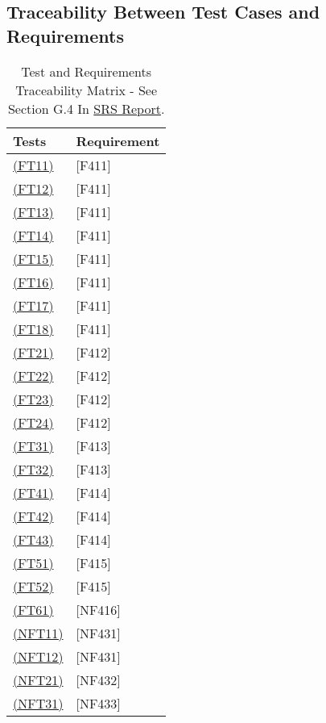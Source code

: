 \documentclass[12pt, titlepage]{article}
\begin{document}
\subsection{Traceability Between Test Cases and Requirements}

\begin{table}[H]
  
  \centering
  \caption{Test and Requirements Traceability Matrix - See Section G.4 In \href{https://github.com/takhtart/PCD/blob/main/docs/SRS/SRS.pdf}{SRS Report}.}
  \begin{tabular}{|l|l|}
  \hline
  Tests   & Requirement \\
  \hline
  \hyperref[FT11]{(FT11)}  & {[}F411{]}  \\
  \hline
  \hyperref[FT12]{(FT12)}  & {[}F411{]}  \\
  \hline
  \hyperref[FT13]{(FT13)}  & {[}F411{]}  \\
  \hline
  \hyperref[FT14]{(FT14)} & {[}F411{]}  \\
  \hline
  \hyperref[FT15]{(FT15)}  & {[}F411{]}  \\
  \hline
  \hyperref[FT16]{(FT16)}  & {[}F411{]}  \\
  \hline
  \hyperref[FT17]{(FT17)}  & {[}F411{]}  \\
  \hline
  \hyperref[FT18]{(FT18)}  & {[}F411{]}  \\
  \hline
  \hyperref[FT21]{(FT21)}  & {[}F412{]}  \\
  \hline
  \hyperref[FT22]{(FT22)}  & {[}F412{]}  \\
  \hline
  \hyperref[FT23]{(FT23)}  & {[}F412{]}  \\
  \hline
  \hyperref[FT24]{(FT24)}  & {[}F412{]}  \\
  \hline
  \hyperref[FT31]{(FT31)}  & {[}F413{]}  \\
  \hline
  \hyperref[FT32]{(FT32)}  & {[}F413{]}  \\
  \hline
  \hyperref[FT41]{(FT41)}  & {[}F414{]}  \\
  \hline
  \hyperref[FT42]{(FT42)}  & {[}F414{]}  \\
  \hline
  \hyperref[FT43]{(FT43)}  & {[}F414{]}  \\
  \hline
  \hyperref[FT51]{(FT51)}  & {[}F415{]}  \\
  \hline
  \hyperref[FT52]{(FT52)}  & {[}F415{]}  \\
  \hline
  \hyperref[FT61]{(FT61)} & {[}NF416{]} \\
  \hline
  \hyperref[NFT11]{(NFT11)} & {[}NF431{]} \\
  \hline
  \hyperref[NFT12]{(NFT12)} & {[}NF431{]} \\ 
  \hline
  \hyperref[NFT21]{(NFT21)} & {[}NF432{]} \\
  \hline
  \hyperref[NFT31]{(NFT31)} & {[}NF433{]} \\ 
  \hline
  \end{tabular}
  \end{table}
\end{document}
